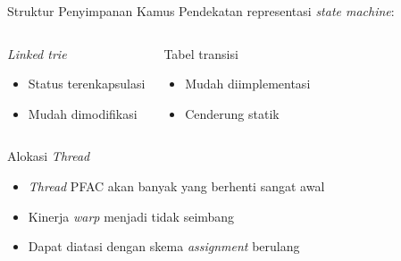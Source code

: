 \documentclass[10pt]{beamer}
\begin{document}
\begin{frame}{Struktur Penyimpanan Kamus}
    Pendekatan representasi \emph{state machine}:
    \begin{columns}[T,onlytextwidth]

          \begin{block}{\emph{Linked trie}}
            \begin{itemize}
                \item Status terenkapsulasi
                \item Mudah dimodifikasi
            \end{itemize}
          \end{block}
    
    
          \begin{block}{Tabel transisi}
            \begin{itemize}
                \item Mudah diimplementasi
                \item Cenderung statik
            \end{itemize}
          \end{block}
    
    \end{columns}
\end{frame}

\begin{frame}{Alokasi \emph{Thread}}
    \begin{itemize}

        \item \emph{Thread} PFAC akan banyak yang berhenti sangat awal

        \item Kinerja \emph{warp} menjadi tidak seimbang

        \item Dapat diatasi dengan skema \emph{assignment} berulang

    \end{itemize}
\end{frame}
\end{document}
